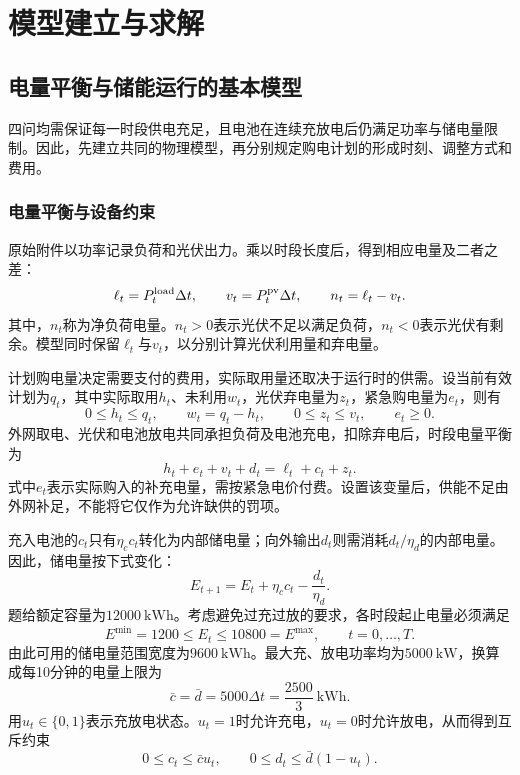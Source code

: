 \section{模型建立与求解}

\subsection{电量平衡与储能运行的基本模型}

四问均需保证每一时段供电充足，且电池在连续充放电后仍满足功率与储电量限制。因此，先建立共同的物理模型，再分别规定购电计划的形成时刻、调整方式和费用。

\subsubsection{电量平衡与设备约束}

原始附件以功率记录负荷和光伏出力。乘以时段长度后，得到相应电量及二者之差：
\begin{equation}
  \ell_t=P_t^{\rm load}\Delta t,\qquad
  v_t=P_t^{\rm pv}\Delta t,\qquad n_t=\ell_t-v_t.
  \label{eq:net-load}
\end{equation}
其中，$n_t$称为净负荷电量。$n_t>0$表示光伏不足以满足负荷，$n_t<0$表示光伏有剩余。模型同时保留$\ell_t$与$v_t$，以分别计算光伏利用量和弃电量。

计划购电量决定需要支付的费用，实际取用量还取决于运行时的供需。设当前有效计划为$q_t$，其中实际取用$h_t$、未利用$w_t$，光伏弃电量为$z_t$，紧急购电量为$e_t$，则有
\begin{equation}
  0\le h_t\le q_t,\qquad w_t=q_t-h_t,\qquad
  0\le z_t\le v_t,\qquad e_t\ge0.
  \label{eq:energy-bounds}
\end{equation}
外网取电、光伏和电池放电共同承担负荷及电池充电，扣除弃电后，时段电量平衡为
\begin{equation}
  h_t+e_t+v_t+d_t=\ell_t+c_t+z_t.
  \label{eq:energy-balance}
\end{equation}
式中$e_t$表示实际购入的补充电量，需按紧急电价付费。设置该变量后，供能不足由外网补足，不能将它仅作为允许缺供的罚项。

充入电池的$c_t$只有$\eta_c c_t$转化为内部储电量；向外输出$d_t$则需消耗$d_t/\eta_d$的内部电量。因此，储电量按下式变化：
\begin{equation}
  E_{t+1}=E_t+\eta_cc_t-\frac{d_t}{\eta_d}.
  \label{eq:soc-transition}
\end{equation}
题给额定容量为$12000\ \mathrm{kWh}$。考虑避免过充过放的要求，各时段起止电量必须满足
\begin{equation}
  E^{\min}=1200\le E_t\le10800=E^{\max},
  \qquad t=0,\ldots,T.
  \label{eq:soc-bounds}
\end{equation}
由此可用的储电量范围宽度为$9600\ \mathrm{kWh}$。最大充、放电功率均为$5000\ \mathrm{kW}$，换算成每10分钟的电量上限为
\begin{equation}
  \bar c=\bar d=5000\Delta t=\frac{2500}{3}\ \mathrm{kWh}.
  \label{eq:power-limit}
\end{equation}
用$u_t\in\{0,1\}$表示充放电状态。$u_t=1$时允许充电，$u_t=0$时允许放电，从而得到互斥约束
\begin{equation}
  0\le c_t\le\bar c u_t,\qquad
  0\le d_t\le\bar d(1-u_t).
  \label{eq:exclusive}
\end{equation}

